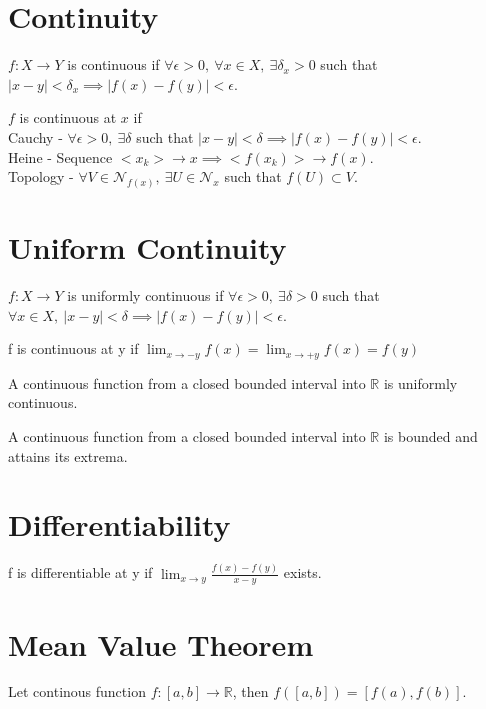 \section{Continuity}
	\begin{definition}
		$f : X \to Y$ is continuous if $\forall \epsilon > 0,\ \forall x \in X,\  \exists \delta_x > 0 $ such that $|x-y|<\delta_x \implies |f(x)-f(y)|<\epsilon$.
	\end{definition}
	\begin{definition}[continuity]$f$ is continuous at $x$ if\\
		Cauchy - $\forall \epsilon > 0,\ \exists \delta$ such that $|x-y|<\delta \implies |f(x)-f(y)|<\epsilon$.\\
		Heine - Sequence $<x_k> \to x \implies <f(x_k)> \to f(x)$.\\
		Topology - $\forall V \in \mathcal{N}_{f(x)},\ \exists U \in \mathcal{N}_x$ such that $f(U) \subset V$.
	\end{definition}
\section{Uniform Continuity}
	\begin{definition}
		$f : X \to Y$ is uniformly continuous if $\forall \epsilon > 0,\ \exists \delta > 0$ such that $\forall x \in X,\ |x-y|<\delta \implies |f(x)-f(y)|<\epsilon$.
	\end{definition}
	\begin{remark}
		f is continuous at y if $\lim_{x\to-y} f(x) = \lim_{x\to+y}f(x)=f(y)$\\
	\end{remark}
	\begin{theorem}
		A continuous function from a closed bounded interval into $\mathbb{R}$ is uniformly continuous.
	\end{theorem}
	\begin{theorem}
		A continuous function from a closed bounded interval into $\mathbb{R}$ is bounded and attains its extrema.
	\end{theorem}

\section{Differentiability}
	\begin{definition}
		f is differentiable at y if $\lim_{x\to y} \frac{f(x)-f(y)}{x-y}$ exists.
	\end{definition}

\section{Mean Value Theorem}
	\begin{theorem}
		Let continous function $f:[a,b]\to\mathbb{R}$, then $f([a,b]) = [f(a),f(b)]$.
	\end{theorem}
